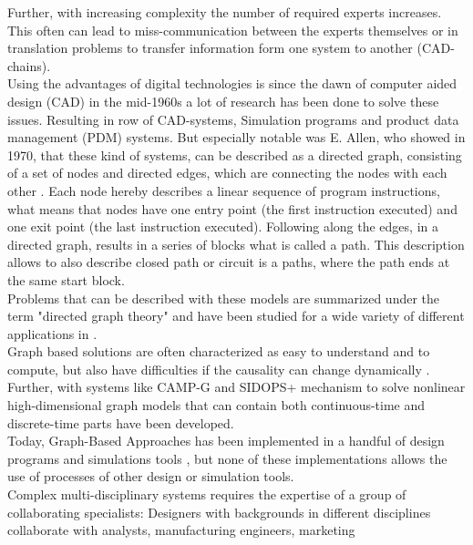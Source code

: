 Further, with increasing complexity the number of required experts increases.
This often can lead to miss-communication between the experts themselves or in translation problems 
to transfer information form one system to another (CAD-chains).\\
Using the advantages of digital technologies is since the dawn of computer aided design (CAD) in the mid-1960s
a lot of research has been done to solve these issues. 
Resulting in row of CAD-systems, Simulation programs and product data management (PDM) systems.
But especially notable was E. Allen, who showed in 1970, that these kind of systems, 
can be described as a directed graph, consisting of a set of nodes and directed edges, 
which are connecting the nodes with each other \cite{allen_control_1970}.
Each node hereby describes a linear sequence of program instructions, 
what means that nodes have one entry point (the first instruction executed) and 
one exit point (the last instruction executed).
Following along the edges, in a directed graph, results in a series of blocks what is called a path.
This description allows to also describe closed path or circuit is a paths, 
where the path ends at the same start block. 
\cite{allen_control_1970}\\
Problems that can be described with these models are summarized 
under the term "directed graph theory" \cite{bang-jensen_digraphs_2009, lehman_directed_2010}
and have been studied for a wide variety of different applications in 
\cite{lehman_directed_2010, aho_theory_1972, kam_global_1976}.\\
Graph based solutions are often characterized as easy to understand and to compute, 
but also have difficulties if the causality can change dynamically \cite{sinha_modeling_2001}. 
Further, with systems like CAMP-G and SIDOPS+ \cite{breunese_modeling_1996} mechanism to solve 
nonlinear high-dimensional graph models that can contain both continuous-time and 
discrete-time parts have been developed.\\
Today, Graph-Based Approaches has been implemented in a handful of design programs and 
simulations tools \cite{noauthor_dynamo_2020, noauthor_function_2020, noauthor_systems_2020},
but none of these implementations allows the use of processes of other design or simulation tools.\\
Complex multi-disciplinary systems requires the expertise of a group of collaborating specialists:
Designers with backgrounds in different disciplines collaborate with analysts, manufacturing engineers, marketing
